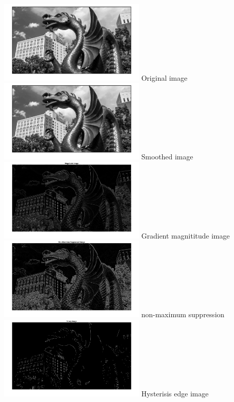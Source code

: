 \documentclass[12pt]{article}
\begin{document}
    \includegraphics[width=7cm]{Smoothed image.png}
    Original image\\
    \includegraphics[width=7cm]{Smoothed image.png}
    Smoothed image\\
    \includegraphics[width=7cm]{Gradient magnititude image.png}
    Gradient magnititude image\\
    \includegraphics[width=7cm]{non-maximum suppression.png}
    non-maximum suppression\\
    \includegraphics[width=7cm]{Hysterisis edge image.png}
    Hysterisis edge image\\
\end{document}
